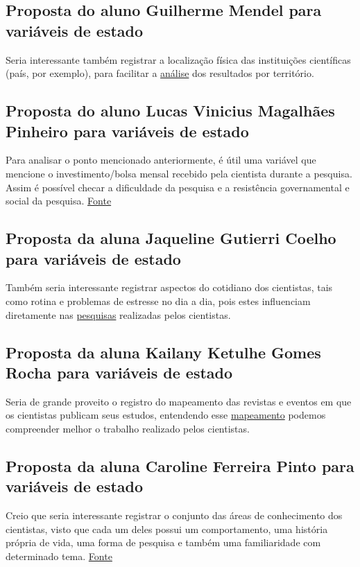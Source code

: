 \subsection{Proposta do aluno Guilherme Mendel para variáveis de estado}
Seria interessante também registrar a localização física das instituições científicas (país, por exemplo), para facilitar a \href{https://pt.wikipedia.org/wiki/An\%C3\%A1lise}{análise} dos resultados por território.

\subsection{Proposta do aluno Lucas Vinicius Magalhães Pinheiro para variáveis de estado}
Para analisar o ponto mencionado anteriormente, é útil uma variável que mencione o investimento/bolsa mensal recebido pela cientista durante a pesquisa. Assim é possível checar a dificuldade da pesquisa e a resistência governamental e social da pesquisa. \href{https://www.ufrgs.br/jornal/cortes-no-investimento-em-ciencia-prejudicam-resposta-a-pandemia-no-brasil/}{Fonte}

\subsection{Proposta da aluna Jaqueline Gutierri Coelho para variáveis de estado}
Também seria interessante registrar aspectos do cotidiano dos cientistas, tais como rotina e problemas de estresse no dia a dia, pois estes influenciam diretamente nas \href{https://journals.openedition.org/eces/507}{pesquisas} realizadas pelos cientistas. 

\subsection{Proposta da aluna Kailany Ketulhe Gomes Rocha para variáveis de estado}

Seria de grande proveito o registro do mapeamento das revistas e eventos em que os cientistas publicam seus estudos, entendendo esse \href{https://www.scielo.br/j/pusp/a/6MzXfkS6XScLfrbBj9WDLd/?lang=pt}{mapeamento} podemos compreender melhor o trabalho realizado pelos cientistas.

\subsection{Proposta da aluna Caroline Ferreira Pinto para variáveis de estado}
Creio que seria interessante registrar o conjunto das áreas de conhecimento dos cientistas, visto que cada um deles possui um comportamento, uma história própria de vida, uma forma de pesquisa e também uma familiaridade com determinado tema. 
\href{https://comportese.com/2014/05/01/o-comportamento-do-cientista}{Fonte}

